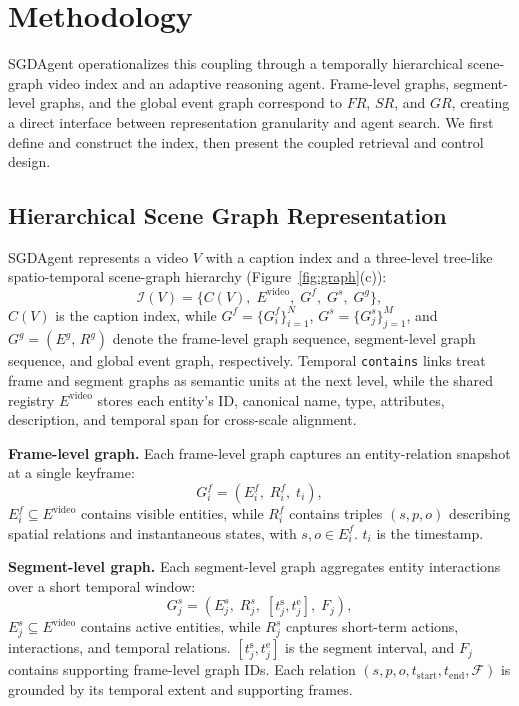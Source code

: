 \documentclass[letterpaper]{article} %
\begin{document}
\section{Methodology}
\label{sec:method}


SGDAgent operationalizes this coupling through a temporally hierarchical scene-graph video index and an adaptive reasoning agent.
Frame-level graphs, segment-level graphs, and the global event graph correspond to $FR$, $SR$, and $GR$, creating a direct interface between representation granularity and agent search.
We first define and construct the index, then present the coupled retrieval and control design.

\subsection{Hierarchical Scene Graph Representation}
\label{sec:representation}

SGDAgent represents a video $V$ with a caption index and a three-level tree-like spatio-temporal scene-graph hierarchy (Figure~\ref{fig:graph}(c)):
\begin{equation}
  \mathcal{I}(V) = \bigl\{C(V),\; E^{\mathrm{video}},\; G^{f},\; G^{s},\; G^{g}\bigr\},
\end{equation}
$C(V)$ is the caption index, while $G^{f}=\{G_i^{f}\}_{i=1}^{N}$, $G^{s}=\{G_j^{s}\}_{j=1}^{M}$, and $G^{g}=(E^{g},\,R^{g})$ denote the frame-level graph sequence, segment-level graph sequence, and global event graph, respectively.
Temporal \texttt{contains} links treat frame and segment graphs as semantic units at the next level, while the shared registry $E^{\mathrm{video}}$ stores each entity's ID, canonical name, type, attributes, description, and temporal span for cross-scale alignment.

\textbf{Frame-level graph.}
Each frame-level graph captures an entity-relation snapshot at a single keyframe:
\begin{equation}
  G_i^{f} = (E_i^{f},\; R_i^{f},\; t_i),
\end{equation}
$E_i^{f} \subseteq E^{\mathrm{video}}$ contains visible entities, while $R_i^{f}$ contains triples $(s,p,o)$ describing spatial relations and instantaneous states, with $s,o \in E_i^{f}$.
$t_i$ is the timestamp.

\textbf{Segment-level graph.}
Each segment-level graph aggregates entity interactions over a short temporal window:
\begin{equation}
  G_j^{s} = (E_j^{s},\; R_j^{s},\;
  [t_j^{\mathrm{s}}, t_j^{\mathrm{e}}],\; F_j),
\end{equation}
$E_j^{s} \subseteq E^{\mathrm{video}}$ contains active entities, while $R_j^{s}$ captures short-term actions, interactions, and temporal relations.
$[t_j^{\mathrm{s}},t_j^{\mathrm{e}}]$ is the segment interval, and $F_j$ contains supporting frame-level graph IDs.
Each relation $(s,p,o,t_{\mathrm{start}},t_{\mathrm{end}},\mathcal{F})$ is grounded by its temporal extent and supporting frames.
\end{document}
